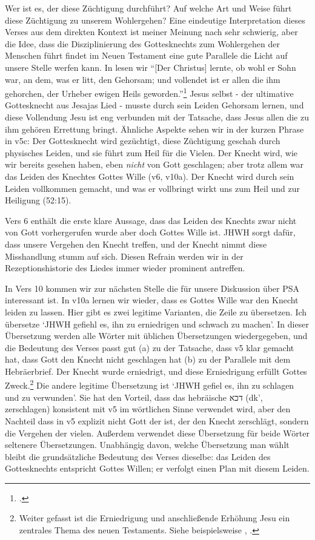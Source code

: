 Wer ist es, der diese Züchtigung durchführt? Auf welche Art und Weise führt diese Züchtigung zu unserem Wohlergehen?
Eine eindeutige Interpretation dieses Verses aus dem direkten Kontext ist meiner Meinung nach sehr schwierig, aber
die Idee, dass die Disziplinierung des Gottesknechts zum Wohlergehen der Menschen führt findet im Neuen Testament eine gute Parallele
die Licht auf unsere Stelle werfen kann. In  lesen wir
``[Der Christus] lernte, ob wohl er Sohn war, an dem, was er litt, den Gehorsam; und vollendet ist er allen die ihm gehorchen, der Urheber ewigen Heils geworden.''\Footcite{elb}
Jesus selbst - der ultimative Gottesknecht aus Jesajas Lied - musste durch sein Leiden Gehorsam lernen, und diese Vollendung Jesu ist eng verbunden mit der Tatsache,
dass Jesus allen die zu ihm gehören Errettung bringt.
Ähnliche Aspekte sehen wir in der kurzen Phrase in v5c: Der Gottesknecht wird gezüchtigt, diese Züchtigung geschah durch physisches Leiden, und sie führt zum Heil für die Vielen.
Der Knecht wird, wie wir bereits gesehen haben, eben \textit{nicht} von Gott geschlagen; aber trotz allem war das Leiden des Knechtes Gottes Wille (v6, v10a).
Der Knecht wird durch sein Leiden vollkommen gemacht, und was er vollbringt wirkt uns zum Heil und zur Heiligung (52:15).

Vers 6 enthält die erste klare Aussage, dass das Leiden des Knechts zwar nicht von Gott vorhergerufen wurde aber doch Gottes Wille ist.
JHWH sorgt dafür, dass unsere Vergehen den Knecht treffen, und der Knecht nimmt diese Misshandlung stumm auf sich.
Diesen Refrain werden wir in der Rezeptionshistorie des Liedes immer wieder prominent antreffen.

In Vers 10 kommen wir zur nächsten Stelle die für unsere Diskussion über PSA interessant ist.
In v10a lernen wir wieder, dass es Gottes Wille war den Knecht leiden zu lassen. Hier gibt es zwei legitime Varianten, die Zeile zu übersetzen.
Ich übersetze `JHWH gefiehl es, ihn zu erniedrigen und schwach zu machen'.
In dieser Übersetzung werden alle Wörter mit üblichen Übersetzungen wiedergegeben, und die Bedeutung des Verses passt gut
(a) zu der Tatsache, dass v5 klar gemacht hat, dass Gott den Knecht nicht geschlagen hat
(b) zu der Parallele mit dem Hebräerbrief.
Der Knecht wurde erniedrigt, und diese Erniedrigung erfüllt Gottes Zweck.\footnote{
	Weiter gefasst ist die Erniedrigung und anschließende Erhöhung Jesu ein zentrales Thema des neuen Testaments.
	Siehe beispielsweise , .
}
Die andere legitime Übersetzung ist `JHWH gefiel es, ihn zu schlagen und zu verwunden'.
Sie hat den Vorteil, dass das hebräische דכא (dk', zerschlagen) konsistent mit v5 im wörtlichen Sinne verwendet wird, aber den Nachteil dass in v5 explizit nicht Gott
der ist, der den Knecht zerschlägt, sondern die Vergehen der vielen.
Außerdem verwendet diese Übersetzung für beide Wörter seltenere Übersetzungen.
Unabhängig davon, welche Übersetzung man wählt bleibt die grundsätzliche Bedeutung des Verses dieselbe:
das Leiden des Gottesknechts entspricht Gottes Willen; er verfolgt einen Plan mit diesem Leiden.

